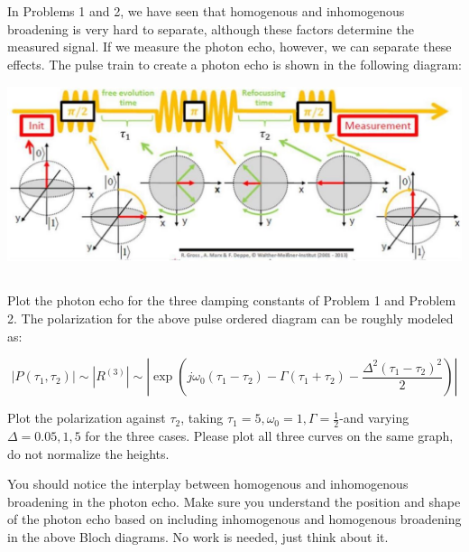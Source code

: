 \documentclass[12pt]{article}
\begin{document}
\section{}
In Problems 1 and 2, we have seen that homogenous and inhomogenous broadening is very hard to separate, although these factors determine the measured signal. If we measure the photon echo, however, we can separate these effects. The pulse train to create a photon echo is
shown in the following diagram:

\begin{center}
\includegraphics[max width=\textwidth]{2024_05_19_b95480aad91fe1b645d5g-2}
\end{center}
\subsection{}
Plot the photon echo for the three damping constants of Problem 1 and Problem 2. The polarization for the above pulse ordered diagram can be roughly modeled as:


$$
\left|P\left(\tau_{1}, \tau_{2}\right)\right| \sim\left|R^{(3)}\right| \sim\left|\exp \left(j \omega_{0}\left(\tau_{1}-\tau_{2}\right)-\Gamma\left(\tau_{1}+\tau_{2}\right)-\frac{\Delta^{2}\left(\tau_{1}-\tau_{2}\right)^{2}}{2}\right)\right|
$$

Plot the polarization against $\tau_{2}$, taking $\tau_{1}=5, \omega_{0}=1, \Gamma=\frac{1}{2}$-and varying $\Delta=0.05,1,5$ for the three cases. Please plot all three curves on the same graph, do not normalize the heights.

You should notice the interplay between homogenous and inhomogenous broadening in the photon echo. Make sure you understand the position and shape of the photon echo based on including inhomogenous and homogenous broadening in the above Bloch diagrams. No work is needed, just think about it.
\end{document}
